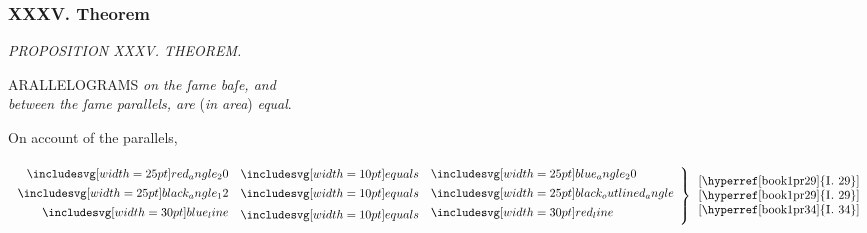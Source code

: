 \documentclass[12pt,preview]{standalone}
\begin{document}
\subsubsection{XXXV. Theorem}

\begin{minipage}[t]{0.33\textwidth}
    \vspace{36pt}
    
\end{minipage}%
\hfill
\begin{minipage}[t]{0.64\textwidth}
    \vspace{0pt}

    \begin{center}
        \textit{PROPOSITION XXXV. THEOREM.}\label{book1pr35} \\
    \end{center}

    \hfill

    \begin{center}
        \raggedright \lettrine[lines=4, loversize=1, nindent=0pt]{}{}ARALLELOGRAMS \textit{on the ſame baſe, and\\ between the ſame parallels, are} (\textit{in area}) \textit{equal}.
    \end{center}

    \hfill

    \hfill

    \hfill

    \begin{center}
        On account of the parallels,\\
        \hfill\\
        $\left.\begin{aligned}\img{red_angle_20} & \bequals \img{blue_angle_20} \\ \img{black_angle_12} & \bequals \img{black_outlined_angle} \\ \blueline & \bequals \redline \end{aligned}\right\}\begin{array}{l}\text{[\hyperref[book1pr29]{\textsc{I.} 29}]} \\ \text{[\hyperref[book1pr29]{\textsc{I.} 29}]} \\ \text{[\hyperref[book1pr34]{\textsc{I.} 34}]} \end{array}$
    \end{center}

    \hfill

    \hfill


\end{minipage}
\end{document}
